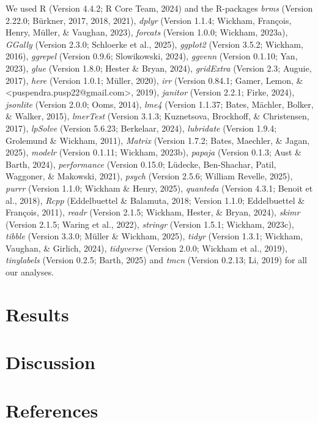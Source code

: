 \documentclass[
  english,
  man,floatsintext]{apa6}
\begin{document}
We used R (Version 4.4.2; R Core Team, 2024) and the R-packages \emph{brms} (Version 2.22.0; Bürkner, 2017, 2018, 2021), \emph{dplyr} (Version 1.1.4; Wickham, François, Henry, Müller, \& Vaughan, 2023), \emph{forcats} (Version 1.0.0; Wickham, 2023a), \emph{GGally} (Version 2.3.0; Schloerke et al., 2025), \emph{ggplot2} (Version 3.5.2; Wickham, 2016), \emph{ggrepel} (Version 0.9.6; Slowikowski, 2024), \emph{ggvenn} (Version 0.1.10; Yan, 2023), \emph{glue} (Version 1.8.0; Hester \& Bryan, 2024), \emph{gridExtra} (Version 2.3; Auguie, 2017), \emph{here} (Version 1.0.1; Müller, 2020), \emph{irr} (Version 0.84.1; Gamer, Lemon, \& \textless puspendra.pusp22@gmail.com\textgreater, 2019), \emph{janitor} (Version 2.2.1; Firke, 2024), \emph{jsonlite} (Version 2.0.0; Ooms, 2014), \emph{lme4} (Version 1.1.37; Bates, Mächler, Bolker, \& Walker, 2015), \emph{lmerTest} (Version 3.1.3; Kuznetsova, Brockhoff, \& Christensen, 2017), \emph{lpSolve} (Version 5.6.23; Berkelaar, 2024), \emph{lubridate} (Version 1.9.4; Grolemund \& Wickham, 2011), \emph{Matrix} (Version 1.7.2; Bates, Maechler, \& Jagan, 2025), \emph{modelr} (Version 0.1.11; Wickham, 2023b), \emph{papaja} (Version 0.1.3; Aust \& Barth, 2024), \emph{performance} (Version 0.15.0; Lüdecke, Ben-Shachar, Patil, Waggoner, \& Makowski, 2021), \emph{psych} (Version 2.5.6; William Revelle, 2025), \emph{purrr} (Version 1.1.0; Wickham \& Henry, 2025), \emph{quanteda} (Version 4.3.1; Benoit et al., 2018), \emph{Rcpp} (Eddelbuettel \& Balamuta, 2018; Version 1.1.0; Eddelbuettel \& François, 2011), \emph{readr} (Version 2.1.5; Wickham, Hester, \& Bryan, 2024), \emph{skimr} (Version 2.1.5; Waring et al., 2022), \emph{stringr} (Version 1.5.1; Wickham, 2023c), \emph{tibble} (Version 3.3.0; Müller \& Wickham, 2025), \emph{tidyr} (Version 1.3.1; Wickham, Vaughan, \& Girlich, 2024), \emph{tidyverse} (Version 2.0.0; Wickham et al., 2019), \emph{tinylabels} (Version 0.2.5; Barth, 2025) and \emph{tmcn} (Version 0.2.13; Li, 2019) for all our analyses.

\section{Results}\label{results-2}

\section{Discussion}\label{discussion}

\newpage

\section{References}\label{references}
\end{document}
